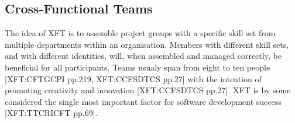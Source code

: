 \documentclass[fina_report_innit.tex]{subfiles}
\begin{document}
\subsection*{Cross-Functional Teams}
The idea of XFT is to assemble project groups with a specific skill set from multiple departments within an organisation. Members with different skill sets, and with different identities, will, when assembled and managed correctly, be beneficial for all participants. Teams usualy span from eight to ten people [XFT:CFTGCPI pp.219, XFT:CCFSDTCS pp.27] with the intention of promoting creativity and innovation [XFT:CCFSDTCS pp.27]. XFT is by some considered the single most important factor for software development success [XFT:TTCRICFT pp.69].
\end{document}
